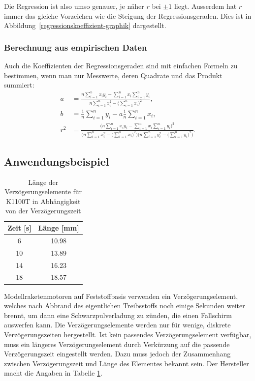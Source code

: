 Die Regression ist also umso genauer, je näher $r$ bei $\pm 1$ liegt.
Ausserdem hat $r$ immer das gleiche Vorzeichen wie die
Steigung der Regressionsgeraden.
Dies ist in Abbildung~\ref{regressionskoeffizient-graphik} dargestellt.

\subsubsection{Berechnung aus empirischen Daten}
Auch die Koeffizienten der Regressionsgeraden sind mit einfachen Formeln
zu bestimmen, wenn man nur Messwerte, deren Quadrate und das Produkt summiert:
\begin{align}
a
&=
\frac{\displaystyle n\sum_{i=1}^nx_iy_i-\sum_{i=1}^nx_i\sum_{i=1}^ny_i}{\displaystyle n\sum_{i=1}^nx_i^2-\biggl(\sum_{i=1}^nx_i\biggr)^2},
\label{lr:a}
\\
b
&=
\frac1n\sum_{i=1}^ny_i-a\frac1n\sum_{i=1}^nx_i,
\label{lr:b}
\\
r^2
&=
\frac{
\displaystyle
\biggl(n\sum_{i=1}^n x_iy_i-\sum_{i=1}^n x_i\sum_{i=1}^ny_i\biggr)^2
}{
\displaystyle
\biggl(n\sum_{i=1}^nx_i^2-\biggl(\sum_{i=1}^nx_i\biggr)^2\biggr)
\biggl(n\sum_{i=1}^ny_i^2-\biggl(\sum_{i=1}^ny_i\biggr)^2\biggr)
}.
\label{lr:r2}
\end{align}

\subsection{Anwendungsbeispiel}
\begin{table}
\begin{center}
\begin{tabular}{|c|c|}
\hline
Zeit [s]&Länge [mm]\\
\hline
6&10.98\\
10&13.89\\
14&16.23\\
18&18.57\\
\hline
\end{tabular}
\end{center}
\caption{Länge der Verzögerungselemente für K1100T in Abhängigkeit von der
Verzögerungszeit\label{delaylengths}}
\end{table}
Modellraketenmotoren auf Feststoffbasis verwenden ein Verzögerungselement,
welches nach Abbrand des eigentlichen Treibsstoffs noch einige Sekunden
weiter brennt, um dann eine Schwarzpulverladung zu zünden, die einen Fallschirm
auswerfen kann.
Die Verzögerungselemente werden nur für wenige, diskrete
Verzögerungszeiten hergestellt.
Ist kein passendes Verzögerungselement
verfügbar, muss
ein längeres Verzögerungselement durch Verkürzung auf die passende
Verzögerungszeit eingestellt werden.
Dazu muss jedoch der Zusammenhang
zwischen Verzögerungszeit und Länge des Elementes bekannt sein.
Der Hersteller macht die Angaben in Tabelle \ref{delaylengths}.

